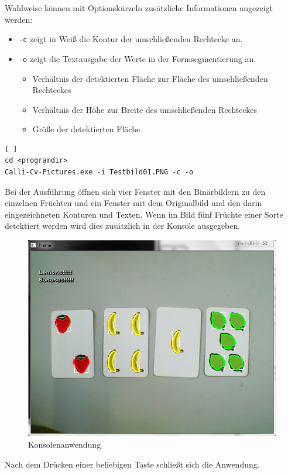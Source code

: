 Wahlweise können mit Optionskürzeln zusätzliche Informationen angezeigt werden:
\begin{itemize}
\item \lstinline{-c} zeigt in Weiß die Kontur der umschließenden Rechtecke an.
\item \lstinline{-o} zeigt die Textausgabe der Werte in der Formsegmentierung an.
\begin{itemize}
\item Verhältnis der detektierten Fläche zur Fläche des umschließenden Rechteckes
\item Verhältnis der Höhe zur Breite des umschließenden Rechteckes
\item Größe der detektierten Fläche
\end{itemize}
\end{itemize}

\begin{singlespace}
\begin{lstlisting}[ ]
cd <programdir>
Calli-Cv-Pictures.exe -i Testbild01.PNG -c -o
\end{lstlisting}
\end{singlespace}
Bei der Ausführung öffnen sich vier Fenster mit den Binärbildern zu den einzelnen Früchten und ein Fenster mit dem Originalbild und den darin eingezeichneten Konturen und Texten.
Wenn im Bild fünf Früchte einer Sorte detektiert werden wird dies zusätzlich in der Konsole ausgegeben.

\begin{figure}[H]
    \centering
    \includegraphics[width=15cm]{Abbildungen/Calli-Konsole}
    \caption[Konsole]{Konsolenanwendung}
    \label{fig:Konsole}
\end{figure}

Nach dem Drücken einer beliebigen Taste schließt sich die Anwendung.
